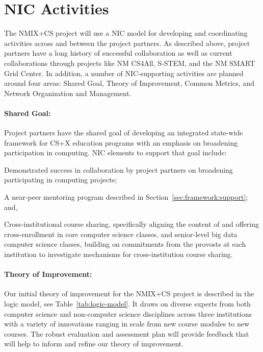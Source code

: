 \section{NIC Activities}
The NMIX+CS project will use a NIC model for developing and coordinating activities across and between the project partners. As described above, project partners have a long history of successful collaboration as well as current collaborations through projects like NM CS4All, S-STEM, and the NM SMART Grid Center. In addition, a number of NIC-supporting activities are planned around four areas: Shared Goal, Theory of Improvement, Common Metrics, and Network Organization and Management.

\paragraph{Shared Goal:} Project partners have the shared goal of developing an integrated state-wide framework for CS+X education programs with an emphasis on broadening participation in computing. NIC elements to support that goal include:
\begin{tightitemize}
        \item Demonstrated success in collaboration by project partners on broadening participating in computing projects;
        \item A near-peer mentoring program described in Section~\ref{sec:framework:support}; and,
        \item Cross-institutional course sharing, specifically aligning the content of and offering cross-enrollment in core computer science classes, and senior-level big data computer science classes, building on commitments from the provosts at each institution to investigate mechanisms for cross-institution course sharing.
\end{tightitemize}

\paragraph{Theory of Improvement:} Our initial theory of improvement for the NMIX+CS project is described in the logic model, see Table~\ref{tab:logic-model}. It draws on diverse experts from both computer science and non-computer science disciplines across three institutions with a variety of innovations ranging in scale from new course modules to new courses. The robust evaluation and assessment plan will provide feedback that will help to inform and refine our theory of improvement.

